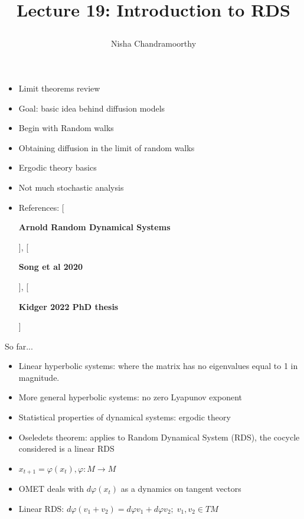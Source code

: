 \documentclass[final]{beamer}
\title{\begin{huge}{Lecture 19: Introduction to RDS}\end{huge}} %
\author{Nisha Chandramoorthy} %
\newcommand{\citesmall}[1]{[{\color{darkcerulean}\begin{small} \textbf{#1} \end{small}}]}
\begin{document}
\frame{\titlepage}

\begin{frame}
	\begin{itemize}
		\item Limit theorems review 
		\item Goal: basic idea behind diffusion models
		\item Begin with Random walks 
		\item Obtaining diffusion in the limit of random walks
		\item Ergodic theory basics
		\item Not much stochastic analysis
		\item References: \citesmall{Arnold Random Dynamical Systems}, \citesmall{Song et al 2020}, \citesmall{Kidger 2022 PhD thesis}   
	\end{itemize}
\end{frame}
\begin{frame}{So far...}
	\begin{itemize}
		\item Linear hyperbolic systems: where the matrix has no eigenvalues equal to 1 in magnitude.
		\item More general hyperbolic systems: no zero Lyapunov exponent
		\item Statistical properties of dynamical systems: ergodic theory
		
		\item Oseledets theorem: applies to Random Dynamical System (RDS), the cocycle considered is a linear RDS

		\item $x_{t+1} = \varphi(x_t), \varphi: M\to M$
		\item OMET deals with $d\varphi(x_t)$ as a dynamics on tangent vectors
		\item Linear RDS: $d\varphi( v_1 + v_2) = d\varphi v_1 + d\varphi v_2; \; v_1, v_2 \in TM$
	
	\end{itemize}
\end{frame}
\end{document}
